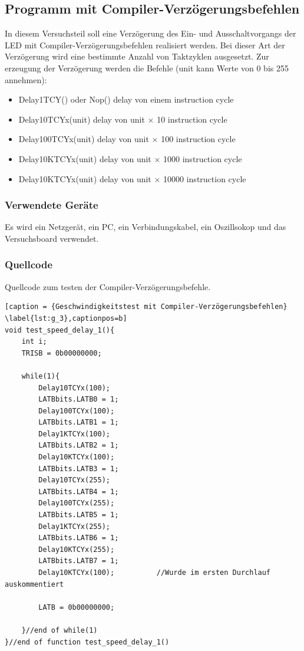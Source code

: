 \documentclass[12pt,a4paper]{article}
\begin{document}
\subsection{Programm mit Compiler-Verzögerungsbefehlen}

In diesem Versuchsteil soll eine Verzögerung des Ein- und Ausschaltvorgangs der LED mit Compiler-Verzögerungsbefehlen realisiert werden. Bei dieser Art der Verzögerung wird eine bestimmte Anzahl von Taktzyklen ausgesetzt. Zur erzeugung der Verzögerung werden die Befehle (unit kann Werte von 0 bis 255 annehmen):

\begin{itemize}
\item	Delay1TCY() oder Nop() delay von einem instruction cycle

\item	Delay10TCYx(unit) delay von unit $\times$ 10 instruction cycle

\item	Delay100TCYx(unit) delay von unit $\times$ 100 instruction cycle

\item	Delay10KTCYx(unit) delay von unit $\times$ 1000 instruction cycle

\item	Delay10KTCYx(unit) delay von unit $\times$ 10000 instruction cycle

\end{itemize}

\subsubsection*{Verwendete Geräte}

Es wird ein Netzgerät, ein PC, ein Verbindungskabel, ein Oszillsokop und das Versuchsboard verwendet.

\subsubsection*{Quellcode}

Quellcode zum testen der Compiler-Verzögerungsbefehle.

\lstset{language=C, basicstyle=\tiny}
\begin{lstlisting}[caption = {Geschwindigkeitstest mit Compiler-Verzögerungsbefehlen} \label{lst:g_3},captionpos=b]
void test_speed_delay_1(){
	int i;
	TRISB = 0b00000000;
	
	while(1){
		Delay10TCYx(100);
		LATBbits.LATB0 = 1;
		Delay100TCYx(100);
		LATBbits.LATB1 = 1;
		Delay1KTCYx(100);
		LATBbits.LATB2 = 1;
		Delay10KTCYx(100);
		LATBbits.LATB3 = 1;
		Delay10TCYx(255);
		LATBbits.LATB4 = 1;
		Delay100TCYx(255);
		LATBbits.LATB5 = 1;
		Delay1KTCYx(255);
		LATBbits.LATB6 = 1;
		Delay10KTCYx(255);
		LATBbits.LATB7 = 1;
		Delay10KTCYx(100);			//Wurde im ersten Durchlauf auskommentiert
		
		LATB = 0b00000000;
		
	}//end of while(1)
}//end of function test_speed_delay_1()
\end{lstlisting}
\end{document}
